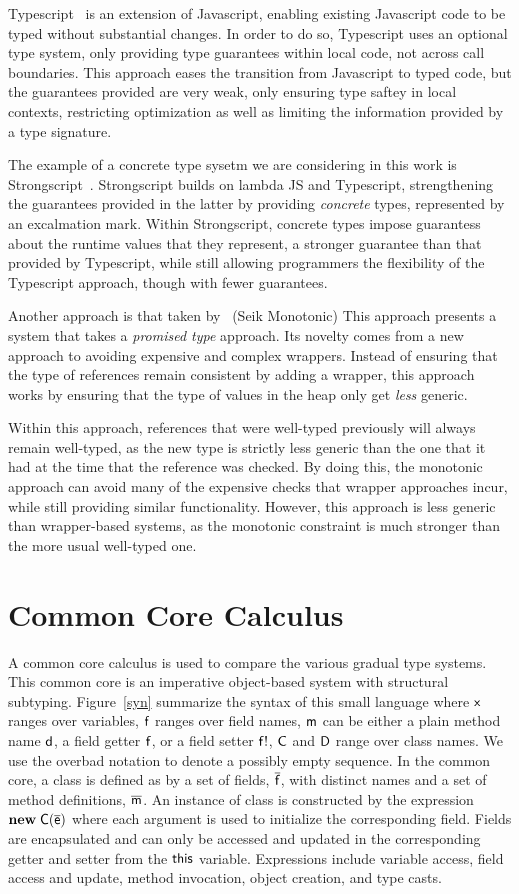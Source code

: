\documentclass{sigplanconf}
\newcommand{\M}[1]{\ensuremath{#1}\xspace}
\newcommand{\xt}[1]{\sf{#1}}
\newcommand{\bt}[1]{\xt{\bf #1}}
\newcommand{\this}{\M{\xt{this}}}
\newcommand{\new}{\M{\bt{new}}}
\newcommand{\NEW}[2]{\M{\new\;#1(#2)}}
\renewcommand{\bar}[1]{\M{\overline{ #1} }}
\newcommand{\m}{\M{\xt{m}}}
\newcommand{\e}{\M{\xt{e}}}
\renewcommand{\d}{\M{\xt{d}}}
\newcommand{\f}{\M{\xt{f}}}
\newcommand{\fb}{\M{\xt{f!}}}
\newcommand{\x}{\M{\xt{x}}}
\newcommand{\C}{\M{\xt{C}}}
\newcommand{\D}{\M{\xt{D}}}
\renewcommand{\d}{\M{\xt{d}}}
\begin{document}
Typescript~\cite{typescript13} is an extension of Javascript, enabling existing 
Javascript code to be typed without substantial changes. In order to do so, 
Typescript uses an optional type system, only providing type guarantees within 
local code, not across call boundaries. This approach eases the transition from
Javascript to typed code, but the guarantees provided are very weak, only 
ensuring type saftey in local contexts, restricting optimization as well as
limiting the information provided by a type signature.

The example of a concrete type sysetm we are considering in this work is
Strongscript~\cite{stongscript}. Strongscript builds on lambda JS and 
Typescript, strengthening the guarantees provided in the latter by providing
\emph{concrete} types, represented by an excalmation mark. Within Strongscript,
concrete types impose guarantess about the runtime values that they represent, 
a stronger guarantee than that provided by Typescript, while still allowing
programmers the flexibility of the Typescript approach, though with fewer
guarantees.

Another approach is that taken by~\cite{seik-monotonic} (Seik Monotonic)
This approach presents a system that takes a \emph{promised type} approach.
Its novelty comes from a new approach to avoiding expensive and complex
wrappers. Instead of ensuring that the type of references remain consistent
by adding a wrapper, this approach works by ensuring that the type of values in
the heap only get \emph{less} generic.

Within this approach, references that were well-typed previously will always
remain well-typed, as the new type is strictly less generic than the one that
it had at the time that the reference was checked. By doing this, the monotonic
approach can avoid many of the expensive checks that wrapper approaches incur, 
while still providing similar functionality. However, this approach is less
generic than wrapper-based systems, as the monotonic constraint is much stronger
than the more usual well-typed one.

\section{Common Core Calculus}

A common core calculus is used to compare the various gradual type
systems. This common core is an imperative object-based system with
structural subtyping.  Figure~\ref{syn} summarize the syntax of this small
language where \x ranges over variables, \f ranges over field names, \m can
be either a plain method name \d, a field getter \f, or a field setter \fb,
\C and \D range over class names. We use the overbad notation to denote a
possibly empty sequence. In the common core, a class is defined as by a set
of fields, \bar\f, with distinct names and a set of method definitions,
\bar\m. An instance of class is constructed by the expression \NEW\C{\bar\e}
where each argument is used to initialize the corresponding field. Fields
are encapsulated and can only be accessed and updated in the corresponding
getter and setter from the \this variable.  Expressions include variable
access, field access and update, method invocation, object creation, and
type casts.
\end{document}

